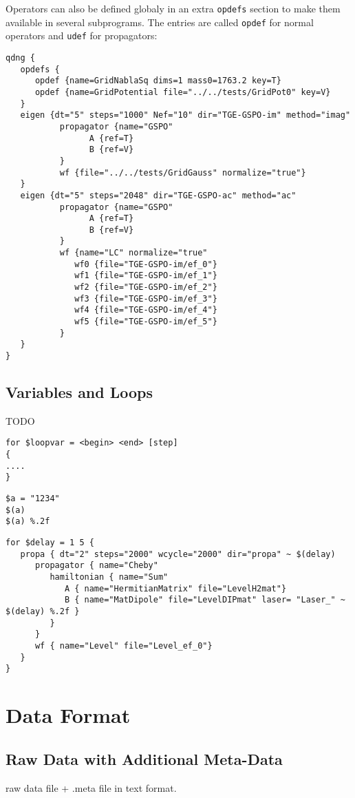 \documentclass[a4paper,12pt]{scrbook}
\begin{document}
Operators can also be defined globaly in an extra \verb|opdefs| section to make them
available in several subprograms. The entries are called \verb|opdef| for normal operators
and \verb|udef| for propagators:
\begin{verbatim}
qdng {
   opdefs {
      opdef {name=GridNablaSq dims=1 mass0=1763.2 key=T}
      opdef {name=GridPotential file="../../tests/GridPot0" key=V}
   }
   eigen {dt="5" steps="1000" Nef="10" dir="TGE-GSPO-im" method="imag"
           propagator {name="GSPO"
                 A {ref=T}
                 B {ref=V}
           }
           wf {file="../../tests/GridGauss" normalize="true"}
   }
   eigen {dt="5" steps="2048" dir="TGE-GSPO-ac" method="ac"
           propagator {name="GSPO"
                 A {ref=T}
                 B {ref=V}
           }
           wf {name="LC" normalize="true"
              wf0 {file="TGE-GSPO-im/ef_0"}
              wf1 {file="TGE-GSPO-im/ef_1"}
              wf2 {file="TGE-GSPO-im/ef_2"}
              wf3 {file="TGE-GSPO-im/ef_3"}
              wf4 {file="TGE-GSPO-im/ef_4"}
              wf5 {file="TGE-GSPO-im/ef_5"}
           }
   }
}
\end{verbatim}

\section{Variables and Loops}
TODO
\begin{verbatim}
for $loopvar = <begin> <end> [step]
{
....
}
\end{verbatim}

\begin{verbatim}
$a = "1234"
$(a)
$(a) %.2f
\end{verbatim}

\begin{verbatim}
for $delay = 1 5 {
   propa { dt="2" steps="2000" wcycle="2000" dir="propa" ~ $(delay) 
      propagator { name="Cheby"
         hamiltonian { name="Sum"
            A { name="HermitianMatrix" file="LevelH2mat"}
            B { name="MatDipole" file="LevelDIPmat" laser= "Laser_" ~ $(delay) %.2f }
         }
      }
      wf { name="Level" file="Level_ef_0"}
   }
} 
\end{verbatim}


\chapter{Data Format}

\section{Raw Data with Additional Meta-Data}
raw data file + .meta file in text format.
\end{document}
